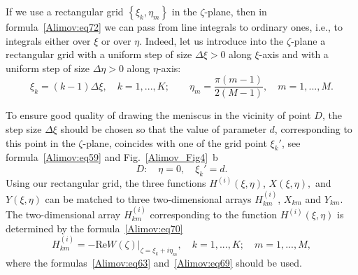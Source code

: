 \documentclass[
11pt,%
tightenlines,%
twoside,%
onecolumn,%
nofloats,%
nobibnotes,%
nofootinbib,%
superscriptaddress,%
noshowpacs,%
centertags]%
{revtex4-2}
\begin{document}
If we use a rectangular grid $\left\{ {\xi_k, \eta_m } \right\}$ in the $\zeta$-plane, then in
formula~\eqref{Alimov:eq72} we can pass from line integrals to ordinary ones, i.e., to integrals
either over $\xi$ or over $\eta$. Indeed, let us introduce into the $\zeta$-plane a rectangular
grid with a uniform step of size $\Delta \xi > 0$ along $\xi$-axis and with a uniform step of size
$\Delta \eta > 0$ along $\eta$-axis:
\[
\xi_k = (k - 1)\Delta \xi, \quad k = 1,...,K; \quad \quad \eta _m = \frac{\pi (m - 1)}{2(M - 1)},
\quad m = 1,...,M.
\]

To ensure good quality of drawing the meniscus in the vicinity of point $D$, the step size $\Delta
\xi$ should be chosen so that the value of parameter $d$, corresponding to this point in the
$\zeta$-plane, coincides with one of the grid point $\xi_{k}'$, see formula~\eqref{Alimov:eq59} and
Fig.~\ref{Alimov_Fig4}~b
\[
D: \quad \eta = 0,\quad \xi_{k}' = d.
\]
Using our rectangular grid, the three functions $H^{(i)}(\xi, \eta)$, $X(\xi, \eta),$ and $Y(\xi,
\eta)$ can be matched to three two-dimensional arrays $H_{km}^{(i)}$, $X_{km}$ and $Y_{km}$. The
two-dimensional array $H_{km}^{(i)}$ corresponding to the function $H^{(i)}(\xi, \eta)$ is
determined by the formula~\eqref{Alimov:eq70}
\begin{equation}
\label{Alimov:eq73} H_{km}^{(i)} = - \mbox{Re} \left. {W(\zeta)} \right|_{\zeta = \xi_k + i\eta_m
}, \quad k = 1,...,K; \quad m = 1,...,M,
\end{equation}
where the formulas~\eqref{Alimov:eq63} and~\eqref{Alimov:eq69} should be used.
\end{document}
